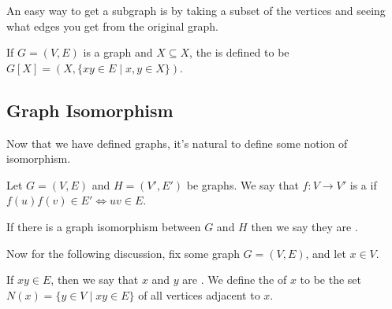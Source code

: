 \documentclass[a4paper]{scrreprt}
\begin{document}
An easy way to get a subgraph is by taking a subset of the vertices and seeing what edges you get from the original graph.

\begin{definition}
	If $G = (V, E)$ is a graph and $X \subseteq X$, the  is defined to be $G[X] = (X, \{xy \in E \mid x, y \in X\})$.
\end{definition}

\subsection{Graph Isomorphism}

Now that we have defined graphs, it's natural to define some notion of isomorphism.

\begin{definition}
	Let $G = (V, E)$ and $H = (V', E')$ be graphs. We say that $f : V \rightarrow V'$ is a  if $f(u)f(v) \in E' \iff uv \in E$. 

	If there is a graph isomorphism between $G$ and $H$ then we say they are .
\end{definition}

Now for the following discussion, fix some graph $G = (V, E)$, and let $x \in V$. 

\begin{definition}[Neighbourhood]
	If $xy \in E$, then we say that $x$ and $y$ are .
	We define the  of $x$ to be the set $N(x) = \{ y \in V \mid xy \in E\}$ of all vertices adjacent to $x$.
\end{definition}
\end{document}
